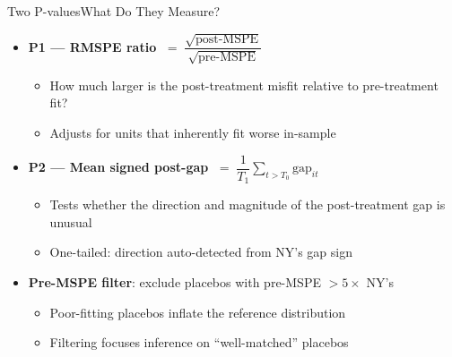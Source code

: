 \documentclass[hyperref={pdfpagelabels=false}]{beamer}
\begin{document}
\begin{frame}{Two P-values}{What Do They Measure?}
\begin{itemize}
    \item \textbf{P1 --- RMSPE ratio}
    $\;=\; \dfrac{\sqrt{\text{post-MSPE}}}{\sqrt{\text{pre-MSPE}}}$
    \begin{itemize}
        \vspace{0.05cm}
        \item How much larger is the post-treatment misfit relative to pre-treatment fit?
        \vspace{0.05cm}
        \item Adjusts for units that inherently fit worse in-sample
    \end{itemize}
    \vspace{0.2cm}
    \item \textbf{P2 --- Mean signed post-gap}
    $\;=\; \dfrac{1}{T_1}\sum_{t>T_0}\text{gap}_{it}$
    \begin{itemize}
        \vspace{0.05cm}
        \item Tests whether the direction and magnitude of the post-treatment gap is unusual
        \vspace{0.05cm}
        \item One-tailed: direction auto-detected from NY's gap sign
    \end{itemize}
    \vspace{0.2cm}
    \item \textbf{Pre-MSPE filter}: exclude placebos with
    pre-MSPE $> 5\times$ NY's
    \begin{itemize}
        \vspace{0.05cm}
        \item Poor-fitting placebos inflate the reference distribution
        \vspace{0.05cm}
        \item Filtering focuses inference on ``well-matched'' placebos
    \end{itemize}
\end{itemize}
\end{frame}
\end{document}
